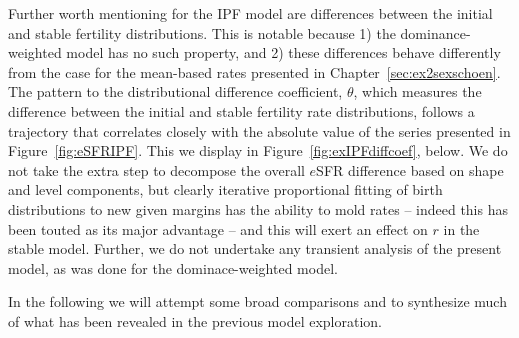 Further worth mentioning for the IPF model are differences between the initial
and stable fertility distributions. This is notable because 1) the
dominance-weighted model has no such property, and 2) these differences behave
differently from the case for the mean-based rates presented in
Chapter~\ref{sec:ex2sexschoen}. The pattern to the
distributional difference coefficient, $\theta$, which measures the
difference between the initial and stable fertility rate distributions, follows
a trajectory that correlates closely with the absolute value of the series
presented in Figure~\ref{fig:eSFRIPF}. This we display in
Figure~\ref{fig:exIPFdiffcoef}, below. We do not take the extra step to
decompose the overall $e$SFR difference based on shape and level components, but
clearly iterative proportional fitting of birth distributions to new given
margins has the ability to mold rates -- indeed this has been touted as its
major advantage -- and this will exert an effect on $r$ in the stable model.
Further, we do not undertake any transient analysis of the present model, as was
done for the dominace-weighted model.

In the following we will attempt some broad comparisons and to synthesize much
of what has been revealed in the previous model exploration.

\FloatBarrier
